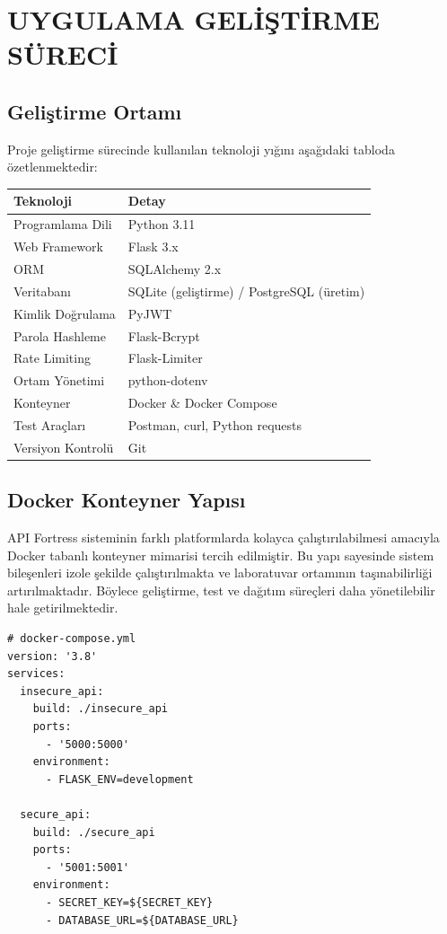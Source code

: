 \section{UYGULAMA GELİŞTİRME SÜRECİ}
\label{bolum8}

\subsection{Geliştirme Ortamı}
\label{geli-tirme-ortam}

Proje geliştirme sürecinde kullanılan teknoloji yığını aşağıdaki tabloda özetlenmektedir:

\begin{table}[H]
\centering
\begin{tabular}{|L{3.5cm}|L{3.5cm}|}
\hline
\textbf{Teknoloji} & \textbf{Detay} \\
\hline
Programlama Dili & Python 3.11 \\
\hline
Web Framework & Flask 3.x \\
\hline
ORM & SQLAlchemy 2.x \\
\hline
Veritabanı & SQLite (geliştirme) / PostgreSQL (üretim) \\
\hline
Kimlik Doğrulama & PyJWT \\
\hline
Parola Hashleme & Flask-Bcrypt \\
\hline
Rate Limiting & Flask-Limiter \\
\hline
Ortam Yönetimi & python-dotenv \\
\hline
Konteyner & Docker \& Docker Compose \\
\hline
Test Araçları & Postman, curl, Python requests \\
\hline
Versiyon Kontrolü & Git \\
\hline
\end{tabular}
\end{table}

\subsection{Docker Konteyner Yapısı}
\label{docker-konteyner-yap-s}

API Fortress sisteminin farklı platformlarda kolayca çalıştırılabilmesi amacıyla Docker tabanlı konteyner mimarisi tercih edilmiştir. Bu yapı sayesinde sistem bileşenleri izole şekilde çalıştırılmakta ve laboratuvar ortamının taşınabilirliği artırılmaktadır. Böylece geliştirme, test ve dağıtım süreçleri daha yönetilebilir hale getirilmektedir.

\begin{lstlisting}
# docker-compose.yml
version: '3.8'
services:
  insecure_api:
    build: ./insecure_api
    ports:
      - '5000:5000'
    environment:
      - FLASK_ENV=development

  secure_api:
    build: ./secure_api
    ports:
      - '5001:5001'
    environment:
      - SECRET_KEY=${SECRET_KEY}
      - DATABASE_URL=${DATABASE_URL}
\end{lstlisting}

